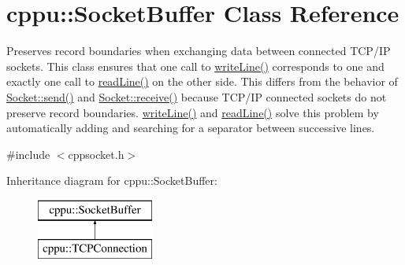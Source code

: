 \hypertarget{classcppu_1_1_socket_buffer}{}\section{cppu\+:\+:Socket\+Buffer Class Reference}
\label{classcppu_1_1_socket_buffer}


Preserves record boundaries when exchanging data between connected T\+C\+P/\+IP sockets. This class ensures that one call to \mbox{\hyperlink{classcppu_1_1_socket_buffer_a92ae0351aaee8719d34e8c4618495d59}{write\+Line()}} corresponds to one and exactly one call to \mbox{\hyperlink{classcppu_1_1_socket_buffer_a222769d3776b9cbd3a727ee1f0e60358}{read\+Line()}} on the other side. This differs from the behavior of \mbox{\hyperlink{classcppu_1_1_socket_aeac77f859159715e2d63a5a0dc118788}{Socket\+::send()}} and \mbox{\hyperlink{classcppu_1_1_socket_a37c382af52cc02f92c0e19a0c6e0e04f}{Socket\+::receive()}} because T\+C\+P/\+IP connected sockets do not preserve record boundaries. \mbox{\hyperlink{classcppu_1_1_socket_buffer_a92ae0351aaee8719d34e8c4618495d59}{write\+Line()}} and \mbox{\hyperlink{classcppu_1_1_socket_buffer_a222769d3776b9cbd3a727ee1f0e60358}{read\+Line()}} solve this problem by automatically adding and searching for a separator between successive lines.  




{\ttfamily \#include $<$cppsocket.\+h$>$}

Inheritance diagram for cppu\+:\+:Socket\+Buffer\+:\begin{figure}[H]
\begin{center}
\leavevmode
\includegraphics[height=2.000000cm]{classcppu_1_1_socket_buffer}
\end{center}
\end{figure}
